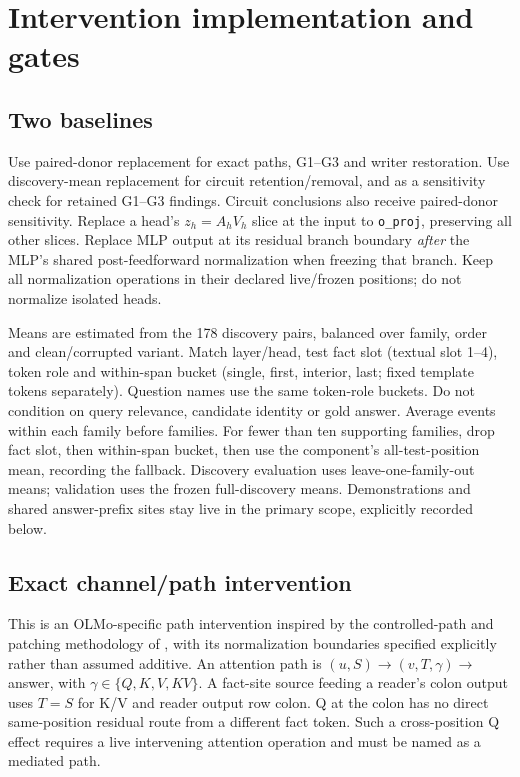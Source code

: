 \documentclass[11pt,a4paper]{article}
\begin{document}
\section{Intervention implementation and gates}
\label{sec:gates}
\subsection{Two baselines}
Use paired-donor replacement for exact paths, G1--G3 and writer restoration. Use
discovery-mean replacement for circuit retention/removal, and as a sensitivity check for retained G1--G3 findings. Circuit conclusions also receive paired-donor sensitivity. Replace a head's
$z_h=A_hV_h$ slice at the input to \texttt{o\_proj}, preserving all other slices.
Replace MLP output at its residual branch boundary \emph{after} the MLP's shared
post-feedforward normalization when freezing that branch. Keep all normalization
operations in their declared live/frozen positions; do not normalize isolated heads.

Means are estimated from the 178 discovery pairs, balanced over family, order and
clean/corrupted variant. Match layer/head, test fact slot (textual slot 1--4), token
role and within-span bucket (single, first, interior, last; fixed template tokens
separately). Question names use the same token-role buckets. Do not condition on
query relevance, candidate identity or gold answer. Average events within each
family before families. For fewer than ten supporting families, drop fact slot,
then within-span bucket, then use the component's all-test-position mean, recording
the fallback. Discovery evaluation uses leave-one-family-out means; validation uses
the frozen full-discovery means. Demonstrations and shared answer-prefix sites stay
live in the primary scope, explicitly recorded below.

\subsection{Exact channel/path intervention}
\label{sec:path}
This is an OLMo-specific path intervention inspired by the controlled-path and
patching methodology of \cite{ioi,patch}, with its normalization boundaries specified
explicitly rather than assumed additive.
An attention path is $(u,S)\to(v,T,\gamma)\to$ answer, with
$\gamma\in\{Q,K,V,KV\}$. A fact-site source feeding a reader's colon output uses
$T=S$ for K/V and reader output row colon. Q at the colon has no direct same-position
residual route from a different fact token. Such a cross-position Q effect requires
a live intervening attention operation and must be named as a mediated path.
\end{document}
